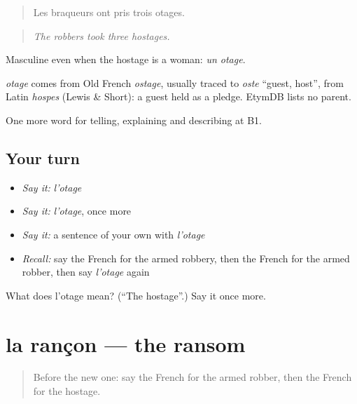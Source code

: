 \begin{quote}
Les braqueurs ont pris trois otages.
\end{quote}

\begin{quote}
\emph{The robbers took three hostages.}
\end{quote}

Masculine even when the hostage is a woman: \emph{un otage}.

\begin{cousinweb}
\emph{otage} comes from Old French \emph{ostage}, usually traced to \emph{oste} \textquotedblleft{}guest, host\textquotedblright{}, from Latin \emph{hospes} (Lewis \& Short): a guest held as a pledge. EtymDB lists no parent.
\end{cousinweb}

\begin{grammarlens}[title={What you've built}]
One more word for telling, explaining and describing at B1.
\end{grammarlens}

\subsection*{Your turn}
\begin{itemize}
\raggedright
  \item \emph{Say it:} \emph{l'otage}
  \item \emph{Say it:} \emph{l'otage}, once more
  \item \emph{Say it:} a sentence of your own with \emph{l'otage}
  \item \emph{Recall:} say the French for the armed robbery, then the French for the armed robber, then say \emph{l'otage} again
\end{itemize}

\begin{tcolorbox}[breakable,colback=teal!4,colframe=teal!35!black,title={Before you move on}]
What does l'otage mean? (\textquotedblleft{}The hostage\textquotedblright{}.) Say it once more.
\end{tcolorbox}
\section[la rançon]{la rançon — the ransom}

\label{lesson:FR-C296-rancon}



\begin{quote}
Before the new one: say the French for the armed robber, then the French for the hostage.
\end{quote}

